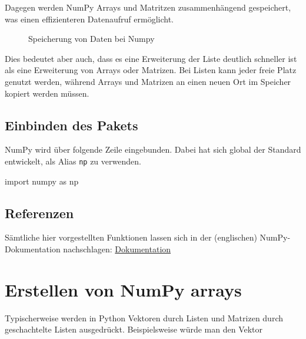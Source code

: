 \documentclass[
  letterpaper,
  DIV=11,
  numbers=noendperiod]{scrreprt}
\newenvironment{Shaded}{\begin{snugshade}}{\end{snugshade}}
\newcommand{\ImportTok}[1]{\textcolor[rgb]{0.00,0.46,0.62}{#1}}
\newcommand{\NormalTok}[1]{\textcolor[rgb]{0.00,0.23,0.31}{#1}}
\begin{document}
\begin{tcolorbox}
\begin{tcolorbox}
Dagegen werden NumPy Arrays und Matritzen zusammenhängend gespeichert,
was einen effizienteren Datenaufruf ermöglicht.

\begin{figure}[H]


\caption{\label{fig-numpy_memory}Speicherung von Daten bei Numpy}

\end{figure}%

Dies bedeutet aber auch, dass es eine Erweiterung der Liste deutlich
schneller ist als eine Erweiterung von Arrays oder Matrizen. Bei Listen
kann jeder freie Platz genutzt werden, während Arrays und Matrizen an
einen neuen Ort im Speicher kopiert werden müssen.

\end{tcolorbox}

\section{Einbinden des Pakets}\label{einbinden-des-pakets}

NumPy wird über folgende Zeile eingebunden. Dabei hat sich global der
Standard entwickelt, als Alias \texttt{np} zu verwenden.

\begin{Shaded}
\begin{Highlighting}[]
\ImportTok{import}\NormalTok{ numpy }\ImportTok{as}\NormalTok{ np}
\end{Highlighting}
\end{Shaded}

\section{Referenzen}\label{referenzen}

Sämtliche hier vorgestellten Funktionen lassen sich in der (englischen)
NumPy-Dokumentation nachschlagen:
\href{https://numpy.org/doc/}{Dokumentation}

\chapter{Erstellen von NumPy arrays}\label{erstellen-von-numpy-arrays}

Typischerweise werden in Python Vektoren durch Listen und Matrizen durch
geschachtelte Listen ausgedrückt. Beispielsweise würde man den Vektor


\end{tcolorbox}
\end{document}
